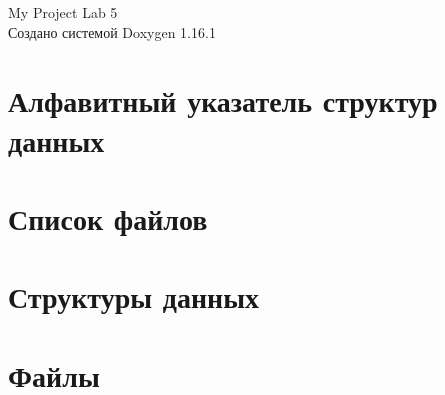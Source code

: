 \documentclass[twoside]{book}
\newcommand{\+}{\discretionary{\mbox{\scriptsize$\hookleftarrow$}}{}{}}
\newcommand{\clearemptydoublepage}{%
    \newpage{\pagestyle{empty}\cleardoublepage}%
  }
\begin{document}
  \raggedbottom
    \hypersetup{pageanchor=false,
                bookmarksnumbered=true,
                pdfencoding=unicode
               }
  \begin{titlepage}
  \vspace*{7cm}
  \begin{center}%
  {\Large My Project Lab 5}\\
  \vspace*{1cm}
  {\large Создано системой Doxygen 1.16.1}\\
  \end{center}
  \end{titlepage}
  \clearemptydoublepage
  \tableofcontents
  \clearemptydoublepage
  \hypersetup{pageanchor=true}

\chapter{Алфавитный указатель структур данных}

\chapter{Список файлов}

\chapter{Структуры данных}

\chapter{Файлы}





  \backmatter
  \newpage
  \clearemptydoublepage
  \printindex
\end{document}
